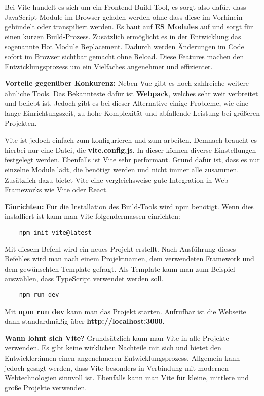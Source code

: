 Bei Vite handelt es sich um ein Frontend-Build-Tool, es sorgt also dafür, dass JavaScript-Module im Browser geladen werden ohne dass diese im Vorhinein gebündelt oder transpiliert werden. Es baut auf \textbf{ES Modules} auf und sorgt für einen kurzen Build-Prozess. Zusätzlich ermöglicht es in der Entwicklung das sogenannte Hot Module Replacement. Dadurch werden Änderungen im Code sofort im Browser sichtbar gemacht ohne Reload. Diese Features machen den Entwicklungsprozess um ein Vielfaches angenehmer und effizienter.

\textbf{Vorteile gegenüber Konkurenz:}
\newline
Neben Vue gibt es noch zahlreiche weitere ähnliche Tools. Das Bekannteste dafür ist \textbf{Webpack}, welches sehr weit verbreitet und beliebt ist. Jedoch gibt es bei dieser Alternative einige Probleme, wie eine lange Einrichtungszeit, zu hohe Komplexität und abfallende Leistung bei größeren Projekten.

Vite ist jedoch einfach zum konfigurieren und zum arbeiten. Demnach braucht es hierbei nur eine  Datei, die \textbf{vite.config.js}. In dieser können diverse Einstellungen festgelegt werden. Ebenfalls ist Vite sehr performant. Grund dafür ist, dass es nur einzelne Module lädt, die benötigt werden und nicht immer alle zusammen. Zusätzlich dazu bietet Vite eine vergleichsweise gute Integration in Web-Frameworks wie Vite oder React.

\textbf{Einrichten:}
\newline
Für die Installation des Build-Tools wird npm benötigt. Wenn dies installiert ist kann man Vite folgendermassen einrichten:

\begin{lstlisting}
    npm init vite@latest
\end{lstlisting}

Mit diesem Befehl wird ein neues Projekt erstellt. Nach Ausführung dieses Befehles wird man nach einem Projektnamen, dem verwendeten Framework und dem gewünschten Template gefragt. Als Template kann man zum Beispiel auswählen, dass TypeScript verwendet werden soll.

\begin{lstlisting}
    npm run dev
\end{lstlisting}

Mit \textbf{npm run dev} kann man das Projekt starten. Aufrufbar ist die Webseite dann standardmäßig über \textbf{http://localhost:3000}.

\textbf{Wann lohnt sich Vite?}
\newline
Grundsätzlich kann man Vite in alle Projekte verwenden. Es gibt keine wirklichen Nachteile mit sich und bietet den Entwickler:innen einen angenehmeren Entwicklungsprozess. Allgemein kann jedoch gesagt werden, dass Vite besonders in Verbindung mit modernen Webtechnologien sinnvoll ist. Ebenfalls kann man Vite für kleine, mittlere und große Projekte verwenden.

\cite{frontend_vite}